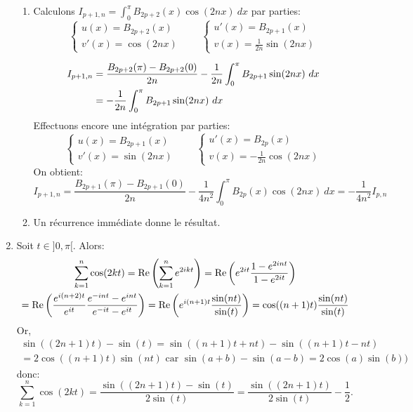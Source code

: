 \begin{enumerate}
\begin{enumerate}
     \item Calculons $\displaystyle{I_{p+1, n} = \int_{0}^{\pi}B_{2p+2}(x)\cos(2nx)\ dx}$ par parties:
     \[ \left \{ \begin{array}{ll}
                  u(x) = B_{2p+2}(x)\\
                  v'(x) = \cos(2nx)
                 \end{array}
         \right. \qquad \left \{ \begin{array}{ll}
                                  u'(x) = B_{2p+1}(x)\\
                                  v(x) = \frac{1}{2n}\sin(2nx)
                                 \end{array}
                        \right.\]

  \begin{align}
    I_{p+1,n} &  = \frac{B_{2p+2}(\pi) - B_{2p+2}(0)}{2n} - \frac{1}{2n}\int_{0}^{\pi}B_{2p+1}\sin(2nx)\ dx \notag \\
    & = -\frac{1}{2n}\int_{0}^{\pi}B_{2p+1}\sin (2nx)\ dx\notag
  \end{align}
  Effectuons encore une intégration par parties:
  \[ \left \{ \begin{array}{ll}
               u(x) = B_{2p+1}(x)\\
               v'(x) = \sin (2nx)
              \end{array}
      \right. \qquad \left \{ \begin{array}{ll}
                               u'(x) = B_{2p}(x)\\
                               v(x) = -\frac{1}{2n}\cos(2nx)
                              \end{array}
                      \right. \]
 On obtient:
\[
  I_{p+1,n}  = \frac{B_{2p+1}(\pi) - B_{2p+1}(0)}{2n} - \frac{1}{4n^{2}} \int_{0}^{\pi}B_{2p}(x)\cos(2nx)\ dx 
   = -\frac{1}{4n^{2}}I_{p,n}
\]
 
 
\item Un récurrence immédiate donne le résultat.
\end{enumerate}


\item Soit $t\in ]0, \pi[$. Alors:
\begin{multline*}
 \sum_{k=1}^{n}\cos(2kt) = \operatorname{Re}\left ( \sum_{k=1}^{n}e^{2ikt}\right )\notag 
  = \operatorname{Re}\left ( e^{2it}\frac{1-e^{2int}}{1-e^{2it}}\right )\notag\\
  = \operatorname{Re}\left (\frac{ e^{i(n+2)t}}{e^{it}}\frac{e^{-int}-e^{int}}{e^{-it}-e^{it}}\right )\notag
  = \operatorname{Re}\left ( e^{i(n+1)t}\frac{\sin (nt)}{\sin (t)}\right ) \notag
  = \cos((n+1)t)\frac{\sin (nt)}{\sin (t)}\notag
\end{multline*}
Or, 
\begin{multline*}
\sin((2n+1)t) - \sin (t) = \sin ((n+1)t + nt) - \sin((n+1)t - nt) \\ = 
2\cos((n+1)t)\sin (nt) \text{ car }\sin (a+b) - \sin (a-b) = 2\cos(a)\sin (b)) 
\end{multline*}
 donc:
\[ 
\sum_{k=1}^{n}\cos(2kt) = \frac{\sin((2n+1)t) -\sin (t)}{2\sin (t)} = \frac{\sin ((2n+1)t)}{2\sin (t)} - \frac{1}{2}.
\]



\end{enumerate}
